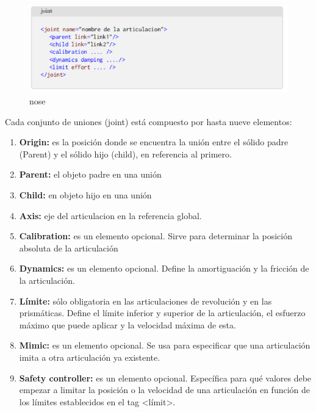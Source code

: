                                         \newpage

        
        \begin{figure}[htb]
            \centering
            \includegraphics[width=1.0\linewidth]{Main/Chapter3/Images3/3-8/codigo-joint.png}
            \caption{nose}
            \label{f:Cap3-8_nose_nose}
        \end{figure} 
        
        Cada conjunto de uniones (joint) está compuesto por hasta nueve elementos:
        
         \begin{enumerate}      
            \item \textbf{Origin:} es la posición donde se encuentra la unión entre el sólido padre (Parent) y el sólido hijo (child), en referencia al primero.
            \item \textbf{Parent:} el objeto padre en una unión
            \item \textbf{Child:} en objeto hijo en una unión
            \item \textbf{Axis:} eje del articulacion en la referencia global.
            \item \textbf{Calibration:} es un elemento opcional. Sirve para determinar la posición absoluta de la articulación
            \item \textbf{Dynamics:} es un elemento opcional. Define la amortiguación y la fricción de la articulación.
            \item \textbf{Límite:} sólo obligatoria en las articulaciones de revolución y en las prismáticas. Define el límite inferior y superior de la articulación, el esfuerzo máximo que puede aplicar y la velocidad máxima de esta.
            \item \textbf{Mimic:} es un elemento opcional. Se usa para especificar que una articulación imita a otra articulación ya existente. 
            \item \textbf{Safety controller:} es un elemento opcional. Específica para qué valores debe empezar a limitar la posición o la velocidad de una articulación en función de los límites establecidos en el tag <límit>.
        \end{enumerate}
        
